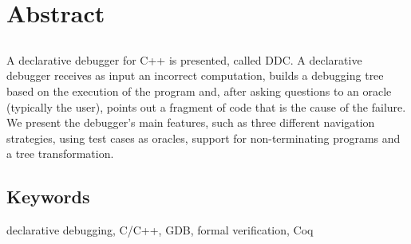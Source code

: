 \chapter*{Abstract}

\section*{\tituloPortadaEngVal}

A declarative debugger for C++ is presented, called DDC. A declarative debugger receives as input an incorrect computation, builds a debugging tree based on the execution of the program and, after asking questions to an oracle (typically the user), points out a fragment of code that is the cause of the failure. We present the debugger’s main features, such as three different navigation strategies, using test cases as oracles, support for non-terminating programs and a tree transformation.

\section*{Keywords}

\noindent declarative debugging, C/C++, GDB, formal verification, Coq




